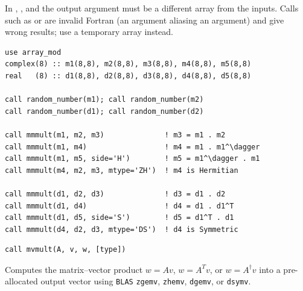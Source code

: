 \begin{warnbox}
In , , and  the output argument must be a different array from the inputs. Calls such as  or  are invalid Fortran (an  argument aliasing an  argument) and give wrong results; use a temporary array instead.
\end{warnbox}

\lstset{language=[95]Fortran}
\begin{lstlisting}
use array_mod
complex(8) :: m1(8,8), m2(8,8), m3(8,8), m4(8,8), m5(8,8)
real   (8) :: d1(8,8), d2(8,8), d3(8,8), d4(8,8), d5(8,8)

call random_number(m1); call random_number(m2)
call random_number(d1); call random_number(d2)

call mmmult(m1, m2, m3)              ! m3 = m1 . m2
call mmmult(m1, m4)                  ! m4 = m1 . m1^\dagger
call mmmult(m1, m5, side='H')        ! m5 = m1^\dagger . m1
call mmmult(m4, m2, m3, mtype='ZH')  ! m4 is Hermitian

call mmmult(d1, d2, d3)              ! d3 = d1 . d2
call mmmult(d1, d4)                  ! d4 = d1 . d1^T
call mmmult(d1, d5, side='S')        ! d5 = d1^T . d1
call mmmult(d4, d2, d3, mtype='DS')  ! d4 is Symmetric
\end{lstlisting}


\lstset{language=[95]Fortran}
\begin{lstlisting}
call mvmult(A, v, w, [type])
\end{lstlisting}

Computes the matrix--vector product $w = A v$, $w = A^T v$, or $w = A^\dagger v$ into a pre-allocated output vector  using \texttt{BLAS} \texttt{zgemv}, \texttt{zhemv}, \texttt{dgemv}, or \texttt{dsymv}.

